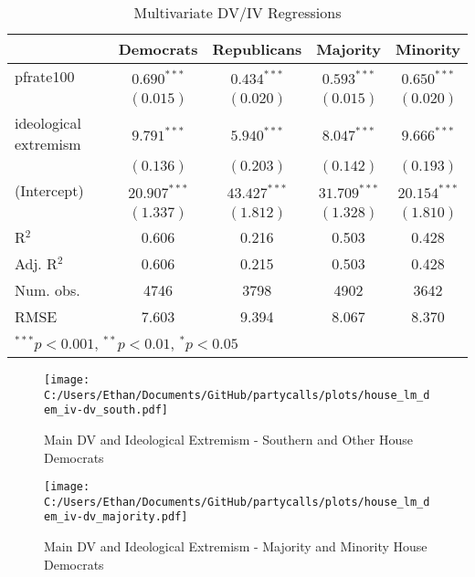 \documentclass[12pt]{article}
\begin{document}
\begin{table}[!htb]
	\begin{center}
		\caption{Multivariate DV/IV Regressions}
		\begin{tabular}{l c c c c }
			\hline
			& Democrats & Republicans & Majority & Minority \\
			\hline
			pfrate100              & $0.690^{***}$  & $0.434^{***}$  & $0.593^{***}$  & $0.650^{***}$  \\
			& $(0.015)$      & $(0.020)$      & $(0.015)$      & $(0.020)$      \\
			ideological extremism & $9.791^{***}$  & $5.940^{***}$  & $8.047^{***}$  & $9.666^{***}$  \\
			& $(0.136)$      & $(0.203)$      & $(0.142)$      & $(0.193)$      \\
			(Intercept)            & $20.907^{***}$ & $43.427^{***}$ & $31.709^{***}$ & $20.154^{***}$ \\
			& $(1.337)$      & $(1.812)$      & $(1.328)$      & $(1.810)$      \\
			\hline
			R$^2$                  & 0.606          & 0.216          & 0.503          & 0.428          \\
			Adj. R$^2$             & 0.606          & 0.215          & 0.503          & 0.428          \\
			Num. obs.              & 4746           & 3798           & 4902           & 3642           \\
			RMSE                   & 7.603          & 9.394          & 8.067          & 8.370          \\
			\hline
			\multicolumn{5}{l}{\scriptsize{$^{***}p<0.001$, $^{**}p<0.01$, $^*p<0.05$}}
		\end{tabular}
	\end{center}
\end{table}

\begin{figure}[ht]
	\caption{Main DV and Ideological Extremism - Southern and Other House Democrats}
	\texttt{[image: C:/Users/Ethan/Documents/GitHub/partycalls/plots/house\_lm\_dem\_iv-dv\_south.pdf]}
\end{figure}

\begin{figure}[ht]
	\caption{Main DV and Ideological Extremism - Majority and Minority House Democrats}
	\texttt{[image: C:/Users/Ethan/Documents/GitHub/partycalls/plots/house\_lm\_dem\_iv-dv\_majority.pdf]}
\end{figure}
\end{document}

